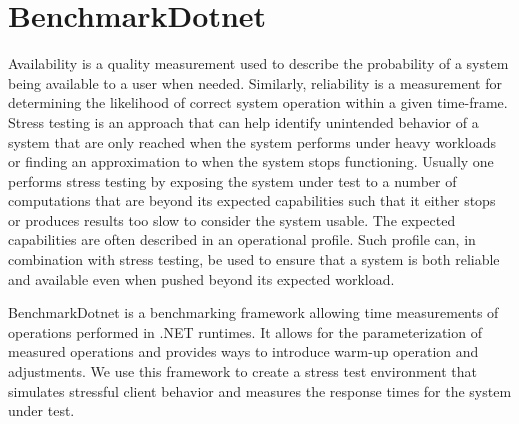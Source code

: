 \section*{BenchmarkDotnet}
Availability is a quality measurement used to describe the probability of a system being available to a user when needed. Similarly, reliability is a measurement for determining the likelihood of correct system operation within a given time-frame. \cite{reliabilityAvailability}
Stress testing is an approach that can help identify unintended behavior of a system that are only reached when the system performs under heavy workloads or finding an approximation to when the system stops functioning.
Usually one performs stress testing by exposing the system under test to a number of computations that are beyond its expected capabilities such that it either stops or produces results too slow to consider the system usable\cite{Sommerville10}.
The expected capabilities are often described in an operational profile\cite{OperationalProfiles}.
Such profile can, in combination with stress testing, be used to ensure that a system is both reliable and available even when pushed beyond its expected workload.

BenchmarkDotnet\cite{Benchmarkdotnet} is a benchmarking framework allowing time measurements of operations performed in .NET runtimes.
It allows for the parameterization of measured operations and provides ways to introduce warm-up operation and adjustments.
We use this framework to create a stress test environment that simulates stressful client behavior and measures the response times for the system under test.